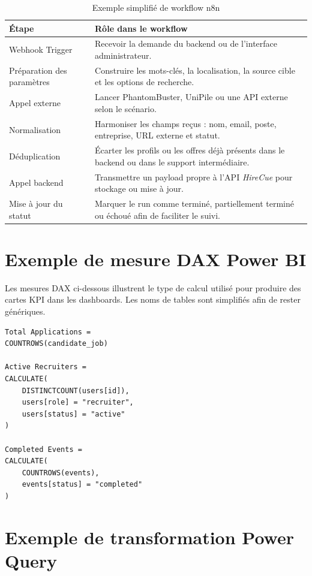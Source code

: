 \begin{table}[H]
\centering
\small
\renewcommand{\arraystretch}{1.25}
\begin{tabular}{|p{4cm}|p{9.5cm}|}
\hline
\rowcolor{TableHeaderBlue}
\textbf{Étape} & \textbf{Rôle dans le workflow} \\
\hline
Webhook Trigger & Recevoir la demande du backend ou de l'interface administrateur. \\
\hline
Préparation des paramètres & Construire les mots-clés, la localisation, la source cible et les options de recherche. \\
\hline
Appel externe & Lancer PhantomBuster, UniPile ou une API externe selon le scénario. \\
\hline
Normalisation & Harmoniser les champs reçus : nom, email, poste, entreprise, URL externe et statut. \\
\hline
Déduplication & Écarter les profils ou les offres déjà présents dans le backend ou dans le support intermédiaire. \\
\hline
Appel backend & Transmettre un payload propre à l'API \textit{HireCue} pour stockage ou mise à jour. \\
\hline
Mise à jour du statut & Marquer le run comme terminé, partiellement terminé ou échoué afin de faciliter le suivi. \\
\hline
\end{tabular}
\normalsize
\caption{Exemple simplifié de workflow n8n}
\end{table}

\section{Exemple de mesure DAX Power BI}

Les mesures DAX ci-dessous illustrent le type de calcul utilisé pour produire des cartes KPI dans les dashboards. Les noms de tables sont simplifiés afin de rester génériques.

\begin{verbatim}
Total Applications =
COUNTROWS(candidate_job)

Active Recruiters =
CALCULATE(
    DISTINCTCOUNT(users[id]),
    users[role] = "recruiter",
    users[status] = "active"
)

Completed Events =
CALCULATE(
    COUNTROWS(events),
    events[status] = "completed"
)
\end{verbatim}

\section{Exemple de transformation Power Query}

